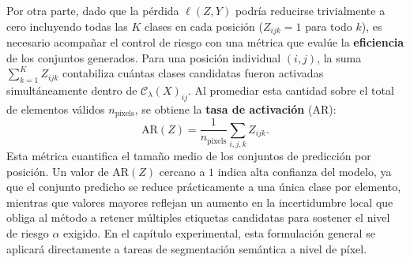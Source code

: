 Por otra parte, dado que la pérdida $\ell(Z,Y)$ podría reducirse trivialmente a cero incluyendo todas las $K$ clases en cada posición ($Z_{ijk} = 1$ para todo $k$), es necesario acompañar el control de riesgo con una métrica que evalúe la \textbf{eficiencia} de los conjuntos generados. Para una posición individual $(i,j)$, la suma $\sum_{k=1}^K Z_{ijk}$ contabiliza cuántas clases candidatas fueron activadas simultáneamente dentro de $\mathcal{C}_\lambda(X)_{ij}$. Al promediar esta cantidad sobre el total de elementos válidos $n_{\text{pixels}}$, se obtiene la \textbf{tasa de activación} ($\text{AR}$):
\begin{equation}
    \text{AR}(Z) = \frac{1}{n_{\text{pixels}}} \sum_{i,j,k} Z_{ijk}.
\end{equation}
Esta métrica cuantifica el tamaño medio de los conjuntos de predicción por posición. Un valor de $\text{AR}(Z)$ cercano a $1$ indica alta confianza del modelo, ya que el conjunto predicho se reduce prácticamente a una única clase por elemento, mientras que valores mayores reflejan un aumento en la incertidumbre local que obliga al método a retener múltiples etiquetas candidatas para sostener el nivel de riesgo $\alpha$ exigido. En el capítulo experimental, esta formulación general se aplicará directamente a tareas de segmentación semántica a nivel de píxel.


























